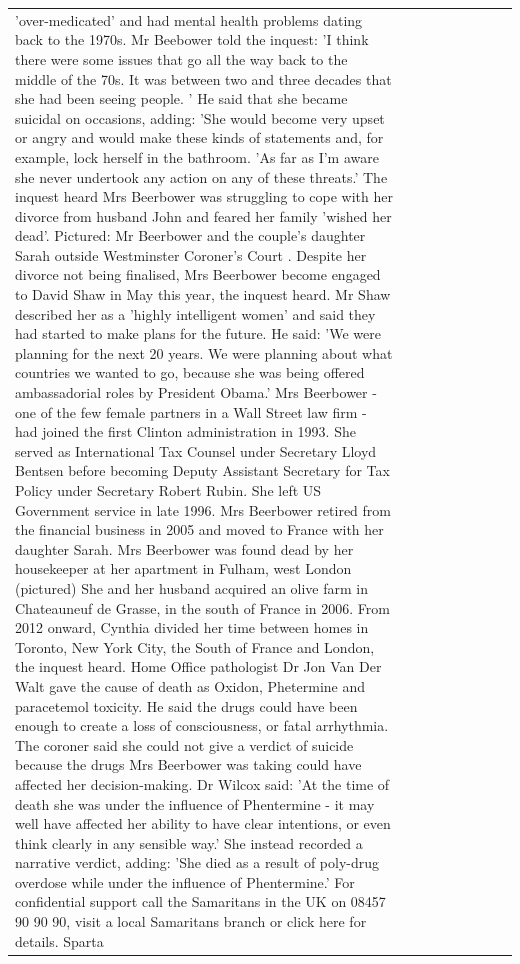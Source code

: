 \begin{table}[H]
\begin{tabular}{lllrlllll}
'over-medicated' and had mental health problems dating back to the 1970s. Mr Beebower told the inquest: 'I think there were some issues that go all the way back to the middle of the 70s. It was between two and three decades that she had been seeing people. ' He said that she became suicidal on occasions, adding: 'She would become very upset or angry and would make these kinds of statements and, for example, lock herself in the bathroom. 'As far as I'm aware she never undertook any action on any of these threats.' The inquest heard Mrs Beerbower was struggling to cope with her divorce from husband John and feared her family 'wished her dead'. Pictured: Mr Beerbower and the couple's daughter Sarah outside Westminster Coroner's Court . Despite her divorce not being finalised, Mrs Beerbower become engaged to David Shaw in May this year, the inquest heard. Mr Shaw described her as a 'highly intelligent women' and said they had started to make plans for the future. He said: 'We were planning for the next 20 years. We were planning about what countries we wanted to go, because she was being offered ambassadorial roles by President Obama.' Mrs Beerbower - one of the few female partners in a Wall Street law firm - had joined the first Clinton administration in 1993. She served as International Tax Counsel under Secretary Lloyd Bentsen before becoming Deputy Assistant Secretary for Tax Policy under Secretary Robert Rubin. She left US Government service in late 1996. Mrs Beerbower retired from the financial business in 2005 and moved to France with her daughter Sarah. Mrs Beerbower was found dead by her housekeeper at her apartment in Fulham, west London (pictured) She and her husband acquired an olive farm in Chateauneuf de Grasse, in the south of France in 2006. From 2012 onward, Cynthia divided her time between homes in Toronto, New York City, the South of France and London, the inquest heard. Home Office pathologist Dr Jon Van Der Walt gave the cause of death as Oxidon, Phetermine and paracetemol toxicity. He said the drugs could have been enough to create a loss of consciousness, or fatal arrhythmia. The coroner said she could not give a verdict of suicide because the drugs Mrs Beerbower was taking could have affected her decision-making. Dr Wilcox said: 'At the time of death she was under the influence of Phentermine - it may well have affected her ability to have clear intentions, or even think clearly in any sensible way.' She instead recorded a narrative verdict, adding: 'She died as a result of poly-drug overdose while under the influence of Phentermine.' For confidential support call the Samaritans in the UK on 08457 90 90 90, visit a local Samaritans branch or click here for details. Sparta \\

\end{tabular}
\end{table}
